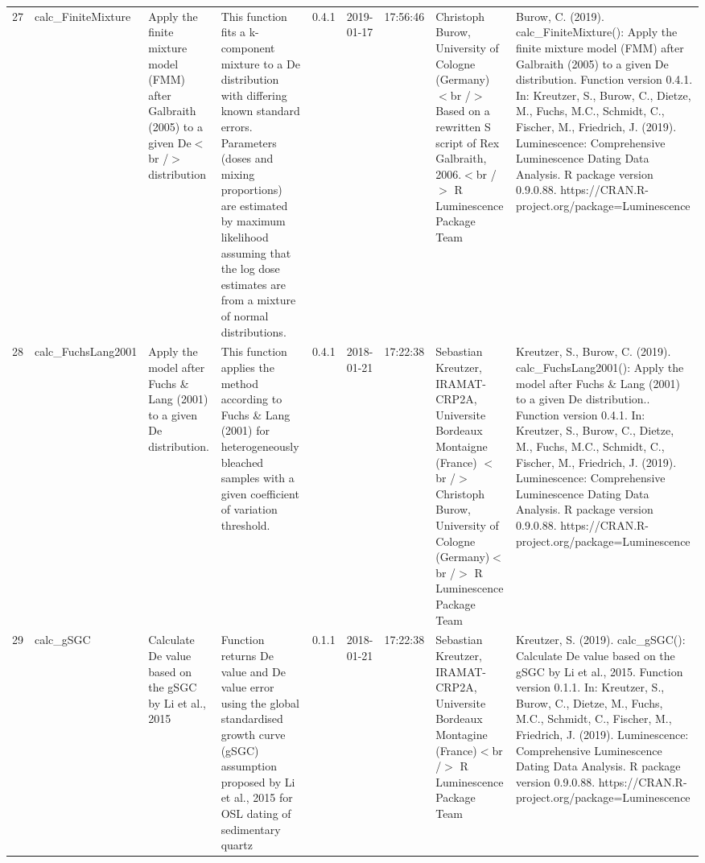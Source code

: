\begin{table}[ht]
\begin{tabular}{rllllllll}
 \\ 
  27 & calc\_FiniteMixture & Apply the finite mixture model (FMM) after Galbraith (2005) to a given De$<$br /$>$ distribution & This function fits a k-component mixture to a De distribution with differing known standard errors. Parameters (doses and mixing proportions) are estimated by maximum likelihood assuming that the log dose estimates are from a mixture of normal distributions. & 0.4.1 & 2019-01-17 & 17:56:46
 & Christoph Burow, University of Cologne (Germany)  $<$br /$>$ Based on a rewritten S script of Rex Galbraith, 2006.$<$br /$>$  R Luminescence Package Team & Burow, C. (2019). calc\_FiniteMixture(): Apply the finite mixture model (FMM) after Galbraith (2005) to a given De distribution. Function version 0.4.1. In: Kreutzer, S., Burow, C., Dietze, M., Fuchs, M.C., Schmidt, C., Fischer, M., Friedrich, J. (2019). Luminescence: Comprehensive Luminescence Dating Data Analysis. R package version 0.9.0.88. https://CRAN.R-project.org/package=Luminescence
 \\ 
  28 & calc\_FuchsLang2001 & Apply the model after Fuchs \& Lang (2001) to a given De distribution. & This function applies the method according to Fuchs \& Lang (2001) for heterogeneously bleached samples with a given coefficient of variation threshold. & 0.4.1 & 2018-01-21 & 17:22:38
 & Sebastian Kreutzer, IRAMAT-CRP2A, Universite Bordeaux Montaigne (France)  $<$br /$>$ Christoph Burow, University of Cologne (Germany)$<$br /$>$  R Luminescence Package Team & Kreutzer, S., Burow, C. (2019). calc\_FuchsLang2001(): Apply the model after Fuchs \& Lang (2001) to a given De distribution.. Function version 0.4.1. In: Kreutzer, S., Burow, C., Dietze, M., Fuchs, M.C., Schmidt, C., Fischer, M., Friedrich, J. (2019). Luminescence: Comprehensive Luminescence Dating Data Analysis. R package version 0.9.0.88. https://CRAN.R-project.org/package=Luminescence
 \\ 
  29 & calc\_gSGC & Calculate De value based on the gSGC by Li et al., 2015 & Function returns De value and De value error using the global standardised growth curve (gSGC) assumption proposed by Li et al., 2015 for OSL dating of sedimentary quartz & 0.1.1 & 2018-01-21 & 17:22:38
 & Sebastian Kreutzer, IRAMAT-CRP2A, Universite Bordeaux Montagine (France)$<$br /$>$  R Luminescence Package Team & Kreutzer, S. (2019). calc\_gSGC(): Calculate De value based on the gSGC by Li et al., 2015. Function version 0.1.1. In: Kreutzer, S., Burow, C., Dietze, M., Fuchs, M.C., Schmidt, C., Fischer, M., Friedrich, J. (2019). Luminescence: Comprehensive Luminescence Dating Data Analysis. R package version 0.9.0.88. https://CRAN.R-project.org/package=Luminescence

\end{tabular}
\end{table}
